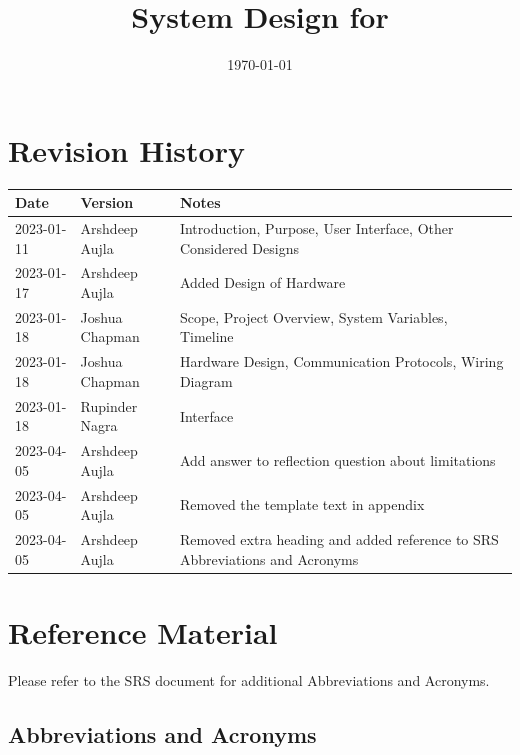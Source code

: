 \documentclass[12pt, titlepage]{article}
\begin{document}
\title{System Design for \progname} 
\author{\authname}
\date{\today}

\maketitle


\section{Revision History}

\begin{tabularx}{\textwidth}{p{3cm}p{2cm}X}
\toprule {\bf Date} & {\bf Version} & {\bf Notes}\\
\midrule
2023-01-11 & Arshdeep Aujla & Introduction, Purpose, User Interface, Other Considered Designs \\
2023-01-17 & Arshdeep Aujla & Added Design of Hardware \\
2023-01-18 & Joshua Chapman & Scope, Project Overview, System Variables, Timeline\\
2023-01-18 & Joshua Chapman & Hardware Design, Communication Protocols, Wiring Diagram\\
2023-01-18 & Rupinder Nagra & Interface\\
2023-04-05 & Arshdeep Aujla & Add answer to reflection question about limitations\\
2023-04-05 & Arshdeep Aujla & Removed the template text in appendix\\
2023-04-05 & Arshdeep Aujla & Removed extra heading and added reference to SRS Abbreviations and Acronyms\\

\bottomrule
\end{tabularx}

\newpage

\section{Reference Material}

Please refer to the SRS document for additional Abbreviations and Acronyms.

\subsection{Abbreviations and Acronyms}
\end{document}
